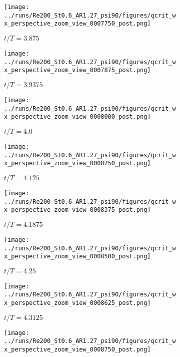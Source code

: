 \begin{figure}
  \centering
  \begin{subfigure}[b]{0.3\textwidth}
    \centering
    \texttt{[image: ../runs/Re200\_St0.6\_AR1.27\_psi90/figures/qcrit\_wx\_perspective\_zoom\_view\_0007750\_post.png]}
    \caption{$t / T = 3.875$}
  \end{subfigure}
  \hfill
  \begin{subfigure}[b]{0.3\textwidth}
    \centering
    \texttt{[image: ../runs/Re200\_St0.6\_AR1.27\_psi90/figures/qcrit\_wx\_perspective\_zoom\_view\_0007875\_post.png]}
    \caption{$t / T = 3.9375$}
  \end{subfigure}
  \hfill
  \begin{subfigure}[b]{0.3\textwidth}
    \centering
    \texttt{[image: ../runs/Re200\_St0.6\_AR1.27\_psi90/figures/qcrit\_wx\_perspective\_zoom\_view\_0008000\_post.png]}
    \caption{$t / T = 4.0$}
  \end{subfigure}
  \vspace{1cm}
  \begin{subfigure}[b]{0.3\textwidth}
    \centering
    \texttt{[image: ../runs/Re200\_St0.6\_AR1.27\_psi90/figures/qcrit\_wx\_perspective\_zoom\_view\_0008250\_post.png]}
    \caption{$t / T = 4.125$}
  \end{subfigure}
  \hfill
  \begin{subfigure}[b]{0.3\textwidth}
    \centering
    \texttt{[image: ../runs/Re200\_St0.6\_AR1.27\_psi90/figures/qcrit\_wx\_perspective\_zoom\_view\_0008375\_post.png]}
    \caption{$t / T = 4.1875$}
  \end{subfigure}
  \hfill
  \begin{subfigure}[b]{0.3\textwidth}
    \centering
    \texttt{[image: ../runs/Re200\_St0.6\_AR1.27\_psi90/figures/qcrit\_wx\_perspective\_zoom\_view\_0008500\_post.png]}
    \caption{$t / T = 4.25$}
  \end{subfigure}
  \vspace{1cm}
  \begin{subfigure}[b]{0.3\textwidth}
    \centering
    \texttt{[image: ../runs/Re200\_St0.6\_AR1.27\_psi90/figures/qcrit\_wx\_perspective\_zoom\_view\_0008625\_post.png]}
    \caption{$t / T = 4.3125$}
  \end{subfigure}
  \hfill
  \begin{subfigure}[b]{0.3\textwidth}
    \centering
    \texttt{[image: ../runs/Re200\_St0.6\_AR1.27\_psi90/figures/qcrit\_wx\_perspective\_zoom\_view\_0008750\_post.png]}

\end{subfigure}
\end{figure}
